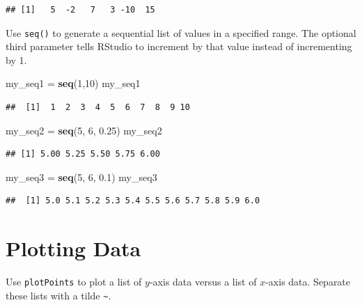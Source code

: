 \documentclass[
]{book}
\newenvironment{Shaded}{\begin{snugshade}}{\end{snugshade}}
\newcommand{\DecValTok}[1]{\textcolor[rgb]{0.00,0.00,0.81}{#1}}
\newcommand{\FloatTok}[1]{\textcolor[rgb]{0.00,0.00,0.81}{#1}}
\newcommand{\KeywordTok}[1]{\textcolor[rgb]{0.13,0.29,0.53}{\textbf{#1}}}
\newcommand{\NormalTok}[1]{#1}
\newcommand{\StringTok}[1]{\textcolor[rgb]{0.31,0.60,0.02}{#1}}
\begin{document}
\begin{verbatim}
## [1]   5  -2   7   3 -10  15
\end{verbatim}

Use \texttt{seq()} to generate a sequential list of values in a specified range. The optional third parameter tells RStudio to increment by that value instead of incrementing by 1.

\begin{Shaded}
\begin{Highlighting}[]
\NormalTok{my_seq1 =}\StringTok{ }\KeywordTok{seq}\NormalTok{(}\DecValTok{1}\NormalTok{,}\DecValTok{10}\NormalTok{)}
\NormalTok{my_seq1}
\end{Highlighting}
\end{Shaded}

\begin{verbatim}
##  [1]  1  2  3  4  5  6  7  8  9 10
\end{verbatim}

\begin{Shaded}
\begin{Highlighting}[]
\NormalTok{my_seq2 =}\StringTok{ }\KeywordTok{seq}\NormalTok{(}\DecValTok{5}\NormalTok{, }\DecValTok{6}\NormalTok{, }\FloatTok{0.25}\NormalTok{)}
\NormalTok{my_seq2}
\end{Highlighting}
\end{Shaded}

\begin{verbatim}
## [1] 5.00 5.25 5.50 5.75 6.00
\end{verbatim}

\begin{Shaded}
\begin{Highlighting}[]
\NormalTok{my_seq3 =}\StringTok{ }\KeywordTok{seq}\NormalTok{(}\DecValTok{5}\NormalTok{, }\DecValTok{6}\NormalTok{, }\FloatTok{0.1}\NormalTok{)}
\NormalTok{my_seq3}
\end{Highlighting}
\end{Shaded}

\begin{verbatim}
##  [1] 5.0 5.1 5.2 5.3 5.4 5.5 5.6 5.7 5.8 5.9 6.0
\end{verbatim}

\hypertarget{plotting-data}{%
\section{Plotting Data}\label{plotting-data}}

Use \texttt{plotPoints} to plot a list of \(y\)-axis data versus a list of \(x\)-axis data. Separate these lists with a tilde \texttt{\textasciitilde{}}.
\end{document}
